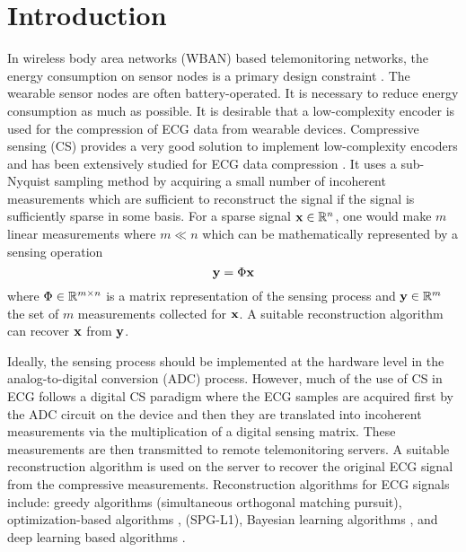 \section{Introduction}
\label{sec:intro}
In wireless body area networks (WBAN)
based telemonitoring networks\cite{cao2009enabling},
the energy consumption on sensor nodes is
a primary design constraint \cite{milenkovic2006wireless}.
The wearable sensor nodes are often battery-operated.
It is necessary to reduce energy consumption as
much as possible.
It is desirable that a low-complexity encoder
is used for the compression of ECG data from wearable
devices.
Compressive sensing (CS) \cite{donoho2006compressed,baraniuk2007compressive,
candes2006compressive, candes2008introduction, candes2006near}
provides a very good solution to implement low-complexity encoders
and has been extensively studied for ECG data
compression \cite{craven2014compressed,kumar2022review}.
It uses a sub-Nyquist sampling method by acquiring a small number
of incoherent measurements which are sufficient to reconstruct
the signal if the signal is sufficiently sparse in some
basis.
For a sparse signal $\mathbf{x} \in \mathbb{R}^n$, one would make
$m$ linear measurements where $m \ll n$ which can be
mathematically represented by a sensing operation
\begin{equation}
\mathbf{y} = \Phi \mathbf{x}
\end{equation}
where $\Phi \in \mathbb{R}^{m \times n}$ is a matrix
representation of the sensing process and $\mathbf{y} \in \mathbb{R}^m$
the set of $m$ measurements collected for $\mathbf{x}$.
A suitable reconstruction algorithm can recover $\mathbf{x}$
from $\mathbf{y}$.

Ideally, the sensing process should be implemented at the
hardware level in the analog-to-digital conversion (ADC) process.
However, much of the use of CS in ECG follows
a digital CS paradigm \cite{mamaghanian2011compressed} where
the ECG samples are acquired first by the ADC circuit on the
device and then they are translated into incoherent
measurements via the multiplication of a digital sensing matrix.
These measurements are then transmitted
to remote telemonitoring servers.
A suitable reconstruction algorithm is used on the server
to recover the original ECG signal from the compressive measurements.
Reconstruction algorithms for ECG signals include:
greedy algorithms 
\cite{polania2011compressed} (simultaneous orthogonal matching pursuit),
optimization-based algorithms \cite{zhang2014energy},
\cite{mamaghanian2011compressed} (SPG-L1),
Bayesian learning algorithms
\cite{zhang2012compressed,zhang2014spatiotemporal,zhang2013extension},
and deep learning based algorithms \cite{zhang2021csnet}.

